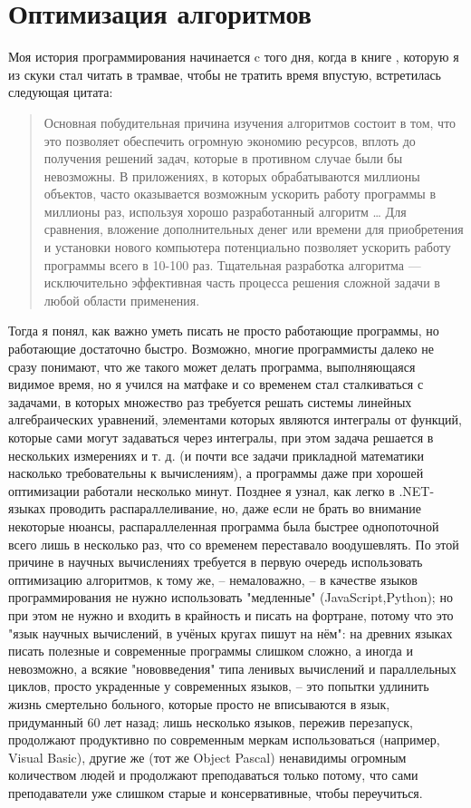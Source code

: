 \documentclass[a4paper, 12pt]{article}
\begin{document}
\section{Оптимизация алгоритмов}
Моя история программирования начинается c того дня, когда в книге \cite{algcpp}, которую я из скуки стал читать в трамвае, чтобы не тратить время впустую, встретилась следующая цитата:
\begin{quote}
    Основная побудительная причина изучения алгоритмов состоит в том, что это позволяет обеспечить огромную экономию ресурсов, вплоть до получения решений задач, которые в противном случае были бы невозможны. В приложениях, в которых обрабатываются миллионы объектов, часто оказывается возможным ускорить работу программы в миллионы раз, используя хорошо разработанный алгоритм \dots
    Для сравнения, вложение дополнительных денег или времени для приобретения и установки 
нового компьютера потенциально позволяет ускорить работу программы всего в 10-100 раз. Тщательная разработка алгоритма — исключительно эффективная часть процесса решения сложной задачи в любой области применения. 
\end{quote}
Тогда я понял, как важно уметь писать не просто работающие программы, но работающие достаточно быстро.
Возможно, многие программисты далеко не сразу понимают, что же такого может делать программа, выполняющаяся видимое время, но я учился на матфаке и со временем стал сталкиваться с задачами, в которых множество раз требуется решать системы линейных алгебраических уравнений, элементами которых являются интегралы от функций, которые сами могут задаваться через интегралы, при этом задача решается в нескольких измерениях и т. д. (и почти все задачи прикладной математики насколько требовательны к вычислениям), а программы даже при хорошей оптимизации работали несколько минут.
Позднее я узнал, как легко в .NET-языках проводить распараллеливание, но, даже если не брать во внимание некоторые нюансы, распараллеленная программа была быстрее однопоточной всего лишь в несколько раз, что со временем переставало воодушевлять.
По этой причине в научных вычислениях требуется в первую очередь использовать оптимизацию алгоритмов, к тому же, -- немаловажно, -- в качестве языков программирования не нужно использовать "медленные" (JavaScript,Python); но при этом не нужно и входить в крайность и писать на фортране, потому что это "язык научных вычислений, в учёных кругах пишут на нём": на древних языках писать полезные и современные программы слишком сложно, а иногда и невозможно, а всякие "нововведения" типа ленивых вычислений и параллельных циклов, просто украденные у современных языков, -- это попытки удлинить жизнь смертельно больного, которые просто не вписываются в язык, придуманный 60 лет назад; лишь несколько языков, пережив перезапуск, продолжают продуктивно по современным меркам использоваться (например, Visual Basic), другие же (тот же Object Pascal) ненавидимы огромным количеством людей и продолжают преподаваться только потому, что сами преподаватели уже слишком старые и консервативные, чтобы переучиться. 
\end{document}
